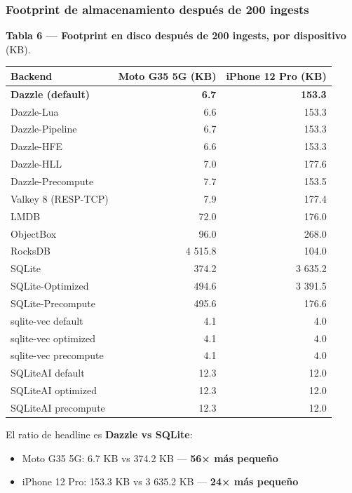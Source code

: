\subsubsection{Footprint de almacenamiento después de 200
ingests}\label{footprint-de-almacenamiento-despuuxe9s-de-200-ingests}

\textbf{Tabla 6 --- Footprint en disco después de 200 ingests, por dispositivo}
(KB).

{\def\LTcaptype{none} %
\begin{longtable}[]{@{}lrr@{}}
\toprule\noalign{}
Backend & Moto G35 5G (KB) & iPhone 12 Pro (KB) \\
\midrule\noalign{}
\endhead
\bottomrule\noalign{}
\endlastfoot
\textbf{Dazzle (default)} & \textbf{6.7} & \textbf{153.3} \\
Dazzle-Lua & 6.6 & 153.3 \\
Dazzle-Pipeline & 6.7 & 153.3 \\
Dazzle-HFE & 6.6 & 153.3 \\
Dazzle-HLL & 7.0 & 177.6 \\
Dazzle-Precompute & 7.7 & 153.5 \\
Valkey 8 (RESP-TCP) & 7.9 & 177.4 \\
LMDB & 72.0 & 176.0 \\
ObjectBox & 96.0 & 268.0 \\
RocksDB & 4 515.8 & 104.0 \\
SQLite & 374.2 & 3 635.2 \\
SQLite-Optimized & 494.6 & 3 391.5 \\
SQLite-Precompute & 495.6 & 176.6 \\
sqlite-vec default & 4.1 & 4.0 \\
sqlite-vec optimized & 4.1 & 4.0 \\
sqlite-vec precompute & 4.1 & 4.0 \\
SQLiteAI default & 12.3 & 12.0 \\
SQLiteAI optimized & 12.3 & 12.0 \\
SQLiteAI precompute & 12.3 & 12.0 \\
\end{longtable}
}

El ratio de headline es \textbf{Dazzle vs SQLite}:

\begin{itemize}
\tightlist
\item
  Moto G35 5G: 6.7 KB vs 374.2 KB --- \textbf{56× más pequeño}
\item
  iPhone 12 Pro: 153.3 KB vs 3 635.2 KB --- \textbf{24× más pequeño}
\end{itemize}

